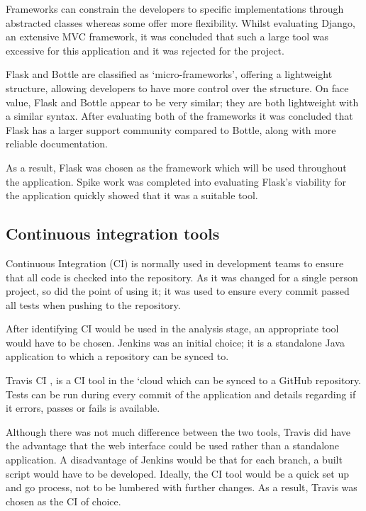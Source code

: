 Frameworks can constrain the developers to specific implementations through abstracted classes whereas some offer more flexibility. Whilst evaluating Django, an extensive MVC framework, it was concluded that such a large tool was excessive for this application and it was rejected for the project.

Flask and Bottle are classified as `micro-frameworks', offering a lightweight structure, allowing developers to have more control over the structure. On face value, Flask and Bottle appear to be very similar; they are both lightweight with a similar syntax. After evaluating both of the frameworks it was concluded that Flask has a larger support community compared to Bottle, along with more reliable documentation.

As a result, Flask was chosen as the framework which will be used throughout the application. Spike work was completed into evaluating Flask's viability for the application quickly showed that it was a suitable tool.

\subsection{Continuous integration tools} \label{tools:CI}
Continuous Integration (CI) is normally used in development teams to ensure that all code is checked into the repository. As it was changed for a single person project, so did the point of using it; it was used to ensure every commit passed all tests when pushing to the repository.

After identifying CI would be used in the analysis stage, an appropriate tool would have to be chosen. Jenkins \cite{citeulike:14023837} was an initial choice; it is a standalone Java application to which a repository can be synced to.

Travis CI \cite{citeulike:14023840}, is a CI tool in the `cloud which can be synced to a GitHub repository. Tests can be run during every commit of the application and details regarding if it errors, passes or fails is available.

Although there was not much difference between the two tools, Travis did have the advantage that the web interface could be used rather than a standalone application. A disadvantage of Jenkins would be that for each branch, a built script would have to be developed. Ideally, the CI tool would be a quick set up and go process, not to be lumbered with further changes. As a result, Travis was chosen as the CI of choice.

